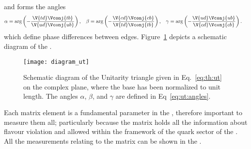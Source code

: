 and forms the angles
\begin{align}
  \alpha &= \arg\left(-\frac{\V{td}\Vconj{tb}}{\V{ud}\Vconj{ub}}\right), &
  \beta  &= \arg\left(-\frac{\V{cd}\Vconj{cb}}{\V{td}\Vconj{tb}}\right), &
  \gamma &= \arg\left(-\frac{\V{ud}\Vconj{ub}}{\V{cd}\Vconj{cb}}\right).
  \label{eq:ut:angles}
\end{align}
which define phase differences between edges.
Figure~\ref{fig:th:ut} depicts a schematic diagram of the \ut.

\begin{figure}
  \begin{center}
      \texttt{[image: diagram\_ut]}
  \end{center}
  \caption[Schematic diagram of the Unitarity Triangle]
  {
    Schematic diagram of the Unitarity triangle given in Eq.~\protect\ref{eq:th:ut} on the complex
    plane, where the base has been normalized to unit length.
    The angles $\alpha$, $\beta$, and $\gamma$ are defined in Eq~\protect\ref{eq:ut:angles}.
  }
  \label{fig:th:ut}
\end{figure}


Each \ckm matrix element is a fundamental parameter in the \sm,  therefore important to
measure them all; particularly because the \ckm matrix holds all
the information about flavour violation and \CPV {} allowed within the
framework of the quark sector of the \sm.
All the measurements relating to the \ckm matrix can be shown in the \ut.







